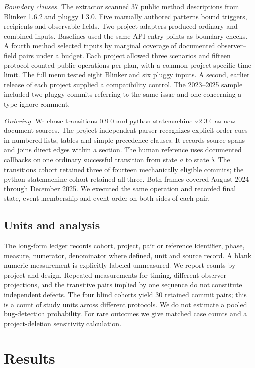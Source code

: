 \documentclass[conference]{IEEEtran}
\begin{document}
\emph{Boundary clauses.} The extractor scanned 37 public method descriptions from Blinker 1.6.2 and pluggy 1.3.0. Five manually authored patterns bound triggers, recipients and observable fields. Two project adapters produced ordinary and combined inputs. Baselines used the same API entry points as boundary checks. A fourth method selected inputs by marginal coverage of documented observer--field pairs under a budget. Each project allowed three scenarios and fifteen protocol-counted public operations per plan, with a common project-specific time limit. The full menu tested eight Blinker and six pluggy inputs. A second, earlier release of each project supplied a compatibility control. The 2023--2025 sample included two pluggy commits referring to the same issue and one concerning a type-ignore comment.

\emph{Ordering.} We chose transitions 0.9.0 and python-statemachine v2.3.0 as new document sources. The project-independent parser recognizes explicit order cues in numbered lists, tables and simple precedence clauses. It records source spans and joins direct edges within a section. The human reference uses documented callbacks on one ordinary successful transition from state $a$ to state $b$. The transitions cohort retained three of fourteen mechanically eligible commits; the python-statemachine cohort retained all three. Both frames covered August 2024 through December 2025. We executed the same operation and recorded final state, event membership and event order on both sides of each pair.

\subsection{Units and analysis}
The long-form ledger records cohort, project, pair or reference identifier, phase, measure, numerator, denominator where defined, unit and source record. A blank numeric measurement is explicitly labeled unmeasured. We report counts by project and design. Repeated measurements for timing, different observer projections, and the transitive pairs implied by one sequence do not constitute independent defects. The four blind cohorts yield 30 retained commit pairs; this is a count of study units across different protocols. We do not estimate a pooled bug-detection probability. For rare outcomes we give matched case counts and a project-deletion sensitivity calculation.

\section{Results}
\end{document}
